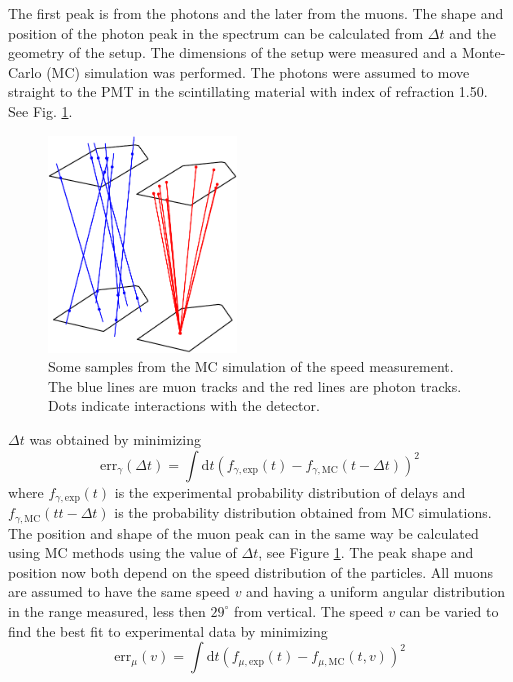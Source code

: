 \documentclass[10pt,twocolumn]{article}
\begin{document}
The first peak is from the photons and the later from the muons. The shape and position of the photon peak in the spectrum can be calculated from $\Delta t$ and the geometry of the setup. The dimensions of the setup were measured and a Monte-Carlo (MC) simulation was performed. The photons were assumed to move straight to the PMT in the scintillating material with index of refraction 1.50. See Fig. \ref{MC}.
\begin{figure}
\centering
\includegraphics[width=5cm]{mc-crop.pdf}
\caption{Some samples from the MC simulation of the speed measurement. The blue lines are muon tracks and the red lines are photon tracks. Dots indicate interactions with the detector.}
\label{MC}
\end{figure}
$\Delta t$ was obtained by minimizing
\begin{equation}
 \mathrm{err}_\gamma(\Delta t)=\int\mathrm{d}t\left(f_{\gamma,\mathrm{exp}}(t)-f_{\gamma,\mathrm{MC}}(t-\Delta t)\right)^2
\end{equation}
where $f_{\gamma,\mathrm{exp}}(t)$ is the experimental probability distribution of delays and $f_{\gamma,\mathrm{MC}}(tt-\Delta t)$ is the probability distribution obtained from MC simulations. The position and shape of the muon peak can in the same way be calculated using MC methods using the value of $\Delta t$, see Figure \ref{MC}. The peak shape and position now both depend on the speed distribution of the particles. All muons are assumed to have the same speed $v$ and having a uniform angular distribution in the range measured, less then $29^\circ$ from vertical. The speed $v$ can be varied to find the best fit to experimental data by minimizing
\begin{equation}
 \mathrm{err}_\mu(v)=\int\mathrm{d}t\left(f_{\mu,\mathrm{exp}}(t)-f_{\mu,\mathrm{MC}}(t,v)\right)^2
\end{equation}
\end{document}
